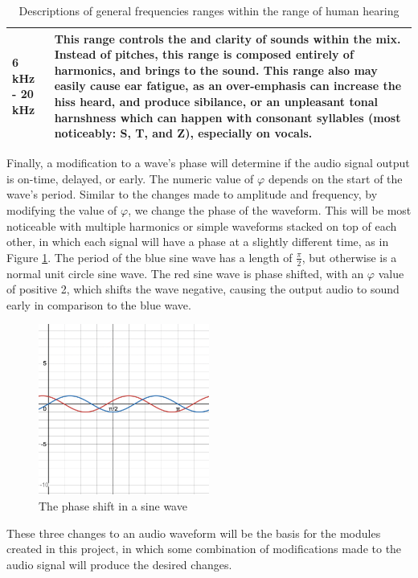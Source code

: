 \begin{table}
\begin{tabular}{|p{20em} | p{25em}|}
		\hline
		6 kHz - 20 kHz & This range controls the \say{brilliance} and clarity of sounds within the mix. Instead of pitches, this range is composed entirely of harmonics, and brings \say{sparkle} to the sound. This range also may easily cause ear fatigue, as an over-emphasis can increase the hiss heard, and produce sibilance, or an unpleasant tonal harnshness which can happen with consonant syllables (most noticeably: S, T, and Z), especially on vocals. \\
		\hline
	\end{tabular}
\caption[A description of the human hearing range]{Descriptions of general frequencies ranges within the range of human hearing}
\label{tbl:frequency-table-of-human-hearing-general}\cite{Suits_1998}\cite{Zjalic_2021}
\end{table}

Finally, a modification to a wave's phase will determine if the audio signal output is on-time, delayed, or early. The numeric value of $\varphi$ depends on the start of the wave's period. Similar to the changes made to amplitude and frequency, by modifying the value of $\varphi$, we change the phase of the waveform. This will be most noticeable with multiple harmonics or simple waveforms stacked on top of each other, in which each signal will have a phase at a slightly different time, as in Figure \ref{fig:sine-wave-phase-shift}. The period of the blue sine wave has a length of $\frac{\pi}{2}$, but otherwise is a normal unit circle sine wave. The red sine wave is phase shifted, with an $\varphi$ value of positive 2, which shifts the wave negative, causing the output audio to sound early in comparison to the blue wave. 

\begin{figure}
	\centering
	\includegraphics[width=0.5\textwidth]{figures/sine-wave-phase-shift.png}
	\caption{The phase shift in a sine wave}
	\label{fig:sine-wave-phase-shift}
\end{figure}

These three changes to an audio waveform will be the basis for the modules created in this project, in which some combination of modifications made to the audio signal will produce the desired changes. 